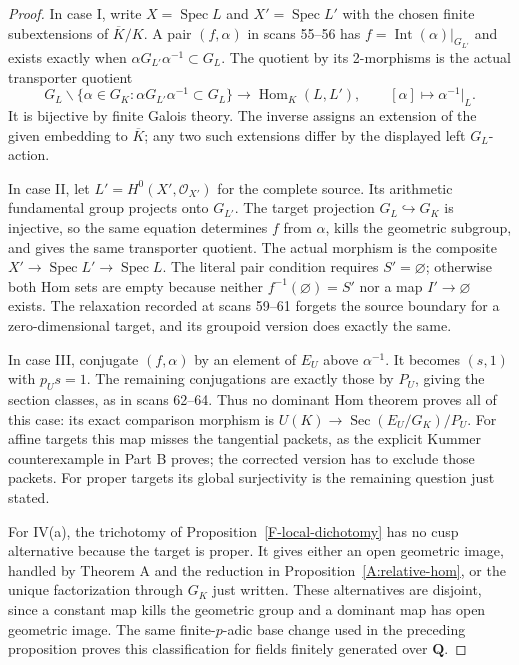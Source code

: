\begin{proof}
In case I, write $X=\operatorname{Spec}L$ and
$X'=\operatorname{Spec}L'$ with the chosen finite subextensions
of $\overline K/K$. A pair $(f,\alpha)$ in scans 55--56 has
$f=\operatorname{Int}(\alpha)|_{G_{L'}}$ and exists exactly when
$\alpha G_{L'}\alpha^{-1}\subset G_L$. The quotient by its
2-morphisms is the actual transporter quotient
\[
 G_L\backslash
 \{\alpha\in G_K:\alpha G_{L'}\alpha^{-1}\subset G_L\}
    \longrightarrow \operatorname{Hom}_K(L,L'),
 \qquad [\alpha]\longmapsto\alpha^{-1}|_L .
\]
It is bijective by finite Galois theory. The inverse assigns an
extension of the given embedding to $\overline K$; any two such
extensions differ by the displayed left $G_L$-action.

In case II, let $L'=H^0(X',\mathcal O_{X'})$ for the complete
source. Its arithmetic fundamental group projects onto $G_{L'}$.
The target projection $G_L\hookrightarrow G_K$ is injective,
so the same equation determines $f$ from $\alpha$, kills the
geometric subgroup, and gives the same transporter quotient.
The actual morphism is the composite
$X'\to\operatorname{Spec}L'\to\operatorname{Spec}L$.
The literal pair condition requires $S'=\varnothing$; otherwise
both Hom sets are empty because neither $f^{-1}(\varnothing)=S'$
nor a map $I'\to\varnothing$ exists. The relaxation recorded
at scans 59--61 forgets the source boundary for a zero-dimensional
target, and its groupoid version does exactly the same.

In case III, conjugate $(f,\alpha)$ by an element of $E_U$
above $\alpha^{-1}$. It becomes $(s,1)$ with $p_Us=1$.
The remaining conjugations are exactly those by $P_U$, giving
the section classes, as in scans 62--64. Thus no dominant Hom
theorem proves all of this case: its exact comparison morphism
is $U(K)\to\operatorname{Sec}(E_U/G_K)/P_U$. For affine
targets this map misses the tangential packets, as the explicit
Kummer counterexample in Part B proves; the corrected version
has to exclude those packets. For proper targets its global
surjectivity is the remaining question just stated.

For IV(a), the trichotomy of Proposition~\ref{F-local-dichotomy}
has no cusp alternative because the target is proper. It gives
either an open geometric image, handled by Theorem A and the
reduction in Proposition~\ref{A:relative-hom}, or the unique
factorization through $G_K$ just written. These alternatives
are disjoint, since a constant map kills the geometric group
and a dominant map has open geometric image. The same
finite-$p$-adic base change used in the preceding proposition
proves this classification for fields finitely generated over
$\mathbf Q$.


\end{proof}
